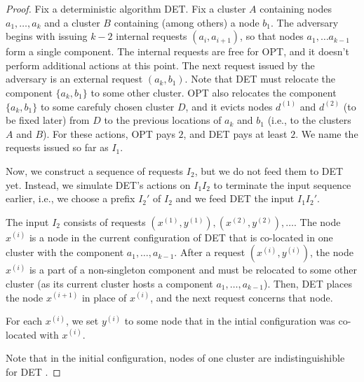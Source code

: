 \begin{proof}


  Fix a deterministic algorithm DET.
  Fix a cluster $A$ containing nodes $a_1, \ldots, a_k$ and a cluster $B$ containing (among others) a node $b_1$.
  The adversary begins with issuing $k-2$ internal requests $(a_i, a_{i+1})$, so that nodes $a_1, \ldots a_{k-1}$ form a single component.
  The internal requests are free for OPT, and it doesn't perform additional actions at this point.
  The next request issued by the adversary is an external request $(a_k, b_1)$.%
  Note that DET must relocate the component $\{a_k, b_1\}$ to some other cluster.
  OPT also relocates the component $\{a_k, b_1\}$ to some carefuly chosen cluster $D$, and it evicts nodes $d^{(1)}$ and $d^{(2)}$ (to be fixed later) from $D$ to the previous locations of $a_k$ and $b_1$ (i.e., to the clusters $A$ and $B$).
  For these actions, OPT pays $2$, and DET pays at least $2$.
  We name the requests issued so far as $I_1$.


  Now, we construct a sequence of requests $I_2$, but we do not feed them to DET yet.
  Instead, we simulate DET's actions on $I_1I_2$ to terminate the input sequence earlier, i.e., we choose a prefix $I_2'$ of $I_2$ and we feed DET the input $I_1I_2'$.


  The input $I_2$ consists of requests $(x^{(1)}, y^{(1)}), (x^{(2)},y^{(2)}),\ldots$.
  The node $x^{(i)}$ is a node in the current configuration of DET that is co-located in one cluster with the component $a_1, \ldots, a_{k-1}$.
  After a request $(x^{(i)}, y^{(i)})$, the node $x^{(i)}$ is a part of a non-singleton component and must be relocated to some other cluster (as its current cluster hosts a component $a_1, \ldots, a_{k-1}$).
  Then, DET places the node $x^{(i+1)}$ in place of $x^{(i)}$, and the next request concerns that node.

  For each $x^{(i)}$, we set $y^{(i)}$ to some node that in the intial configuration was co-located with $x^{(i)}$.
  
  Note that in the initial configuration, nodes of one cluster are indistinguishible for DET .
  

\end{proof}
